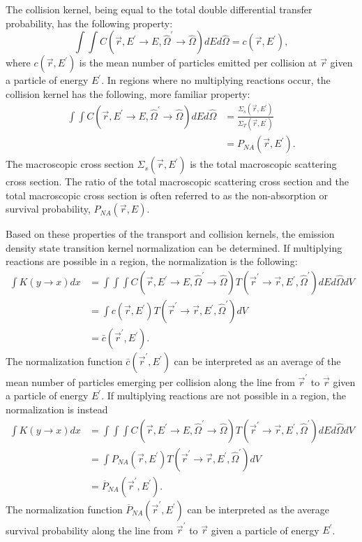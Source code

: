 The collision kernel, being equal to the total double differential transfer 
probability, has the following property:
\begin{equation}
  \int\int C(\vec{r},E^{'} \to E,\hat{\Omega}^{'} \to \hat{\Omega}) 
  dEd\hat{\Omega} = c(\vec{r},E^{'}),
  \label{eq:collision_op_prop_gen}
\end{equation}
where $c(\vec{r},E^{'})$ is the mean number of particles emitted per collision
at $\vec{r}$ given a particle of energy $E^{'}$. In regions where no 
multiplying reactions occur, the collision kernel has the following, more 
familiar property:
\begin{align}
  \int\int C(\vec{r},E^{'} \to E,\hat{\Omega}^{'} \to \hat{\Omega}) 
  dEd\hat{\Omega} & = \frac{\Sigma_s(\vec{r},E^{'})}{\Sigma_T(\vec{r},E^{'})}
  \label{eq:collision_op_prop} \\
  & = P_{NA}(\vec{r},E^{'}). \nonumber 
\end{align}
The macroscopic cross section $\Sigma_s(\vec{r},E^{'})$ is the total macroscopic
scattering cross section. The ratio of the total macroscopic scattering cross
section and the total macroscopic cross section is often referred to as the 
non-absorption or survival probability, $P_{NA}(\vec{r},E)$. 

Based on these properties of the transport and collision kernels, the emission 
density state transition kernel normalization can be determined. If multiplying
reactions are possible in a region, the normalization is the following:
\begin{align}
  \int K(y \to x) dx & = \int\int\int 
  C(\vec{r},E^{'} \to E,\hat{\Omega}^{'} \to \hat{\Omega})
  T(\vec{r}^{'} \to \vec{r},E^{'},\hat{\Omega}^{'}) dE d\hat{\Omega} dV 
  \nonumber \\
  & = \int c(\vec{r},E^{'}) T(\vec{r}^{'} \to \vec{r},E^{'},\hat{\Omega}^{'})
  dV \nonumber \\
  & = \bar{c}(\vec{r}^{'},E^{'}).
\end{align}
The normalization function $\bar{c}(\vec{r}^{'},E^{'})$ can be interpreted as an 
average of the mean number of particles emerging per collision along the line 
from $\vec{r}^{'}$ to $\vec{r}$ given a particle of energy $E^{'}$. If 
multiplying reactions are not possible in a region, the normalization is instead
\begin{align}
  \int K(y \to x) dx & = \int\int\int 
  C(\vec{r},E^{'} \to E,\hat{\Omega}^{'} \to \hat{\Omega})
  T(\vec{r}^{'} \to \vec{r},E^{'},\hat{\Omega}^{'}) dE d\hat{\Omega} dV 
  \nonumber \\
  & = \int P_{NA}(\vec{r},E^{'}) T(\vec{r}^{'} \to \vec{r},E^{'},\hat{\Omega}^{'})
  dV \nonumber \\
  & = \overline{P}_{NA}(\vec{r}^{'},E^{'}).
\end{align}
The normalization function $\overline{P}_{NA}(\vec{r}^{'},E^{'})$ can be 
interpreted as the average survival probability along the line from 
$\vec{r}^{'}$ to $\vec{r}$ given a particle of energy $E^{'}$.

